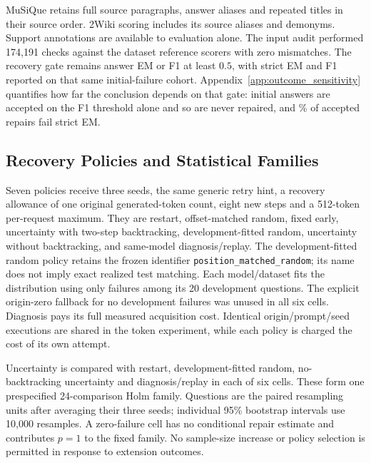 \documentclass{article}
\begin{document}
MuSiQue retains full source paragraphs, answer aliases and repeated titles
in their source order. 2Wiki scoring includes its source aliases and
demonyms. Support annotations are available to evaluation alone. The
input audit performed 174,191 checks against the dataset reference scorers
with zero mismatches. The recovery gate remains answer EM or F1 at least
$0.5$, with strict EM and F1 reported on that same initial-failure cohort.
Appendix~\ref{app:outcome_sensitivity} quantifies how far the conclusion
depends on that gate: \GateOnly{} initial answers are accepted on the F1
threshold alone and so are never repaired, and \GateRepairOnlyPct{}\% of
accepted repairs fail strict EM.

\subsection{Recovery Policies and Statistical Families}
Seven policies receive three seeds, the same generic retry hint, a recovery
allowance of one original generated-token count, eight new steps and a
512-token per-request maximum. They are restart, offset-matched random,
fixed early, uncertainty with two-step backtracking, development-fitted
random, uncertainty without backtracking, and same-model diagnosis/replay.
The development-fitted random policy retains the frozen identifier
\texttt{position\_matched\_random}; its name does not imply exact realized
test matching. Each model/dataset fits the distribution using only failures
among its 20 development questions. The explicit origin-zero fallback for
no development failures was unused in all six cells.
Diagnosis pays its full measured acquisition cost.
Identical origin/prompt/seed executions are shared in the token experiment,
while each policy is charged the cost of its own attempt.

Uncertainty is compared with restart, development-fitted random,
no-backtracking uncertainty and diagnosis/replay in each of six cells.
These form one prespecified 24-comparison Holm family. Questions are the
paired resampling units after averaging their three seeds; individual
95\% bootstrap intervals use 10,000 resamples. A zero-failure cell has no
conditional repair estimate and contributes $p=1$ to the fixed family.
No sample-size increase or policy selection is permitted in response to
extension outcomes.
\end{document}
